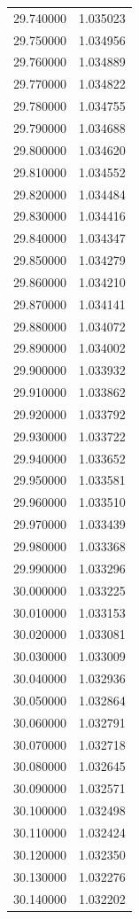 \begin{tabular}{rr}
29.740000 & 1.035023 \\
29.750000 & 1.034956 \\
29.760000 & 1.034889 \\
29.770000 & 1.034822 \\
29.780000 & 1.034755 \\
29.790000 & 1.034688 \\
29.800000 & 1.034620 \\
29.810000 & 1.034552 \\
29.820000 & 1.034484 \\
29.830000 & 1.034416 \\
29.840000 & 1.034347 \\
29.850000 & 1.034279 \\
29.860000 & 1.034210 \\
29.870000 & 1.034141 \\
29.880000 & 1.034072 \\
29.890000 & 1.034002 \\
29.900000 & 1.033932 \\
29.910000 & 1.033862 \\
29.920000 & 1.033792 \\
29.930000 & 1.033722 \\
29.940000 & 1.033652 \\
29.950000 & 1.033581 \\
29.960000 & 1.033510 \\
29.970000 & 1.033439 \\
29.980000 & 1.033368 \\
29.990000 & 1.033296 \\
30.000000 & 1.033225 \\
30.010000 & 1.033153 \\
30.020000 & 1.033081 \\
30.030000 & 1.033009 \\
30.040000 & 1.032936 \\
30.050000 & 1.032864 \\
30.060000 & 1.032791 \\
30.070000 & 1.032718 \\
30.080000 & 1.032645 \\
30.090000 & 1.032571 \\
30.100000 & 1.032498 \\
30.110000 & 1.032424 \\
30.120000 & 1.032350 \\
30.130000 & 1.032276 \\
30.140000 & 1.032202 \\

\end{tabular}
